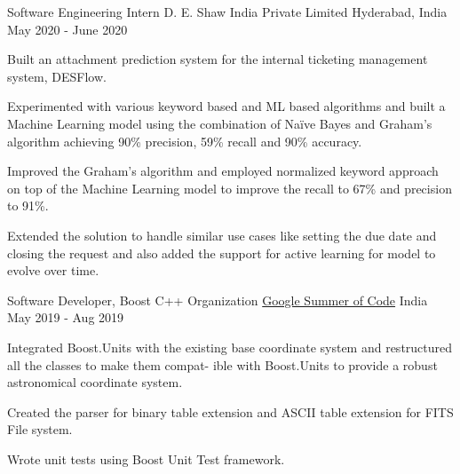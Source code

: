 \begin{cventries}
{\normalsize
  
  \cventry
  {Software Engineering Intern}
  {D. E. Shaw India Private Limited}
  {Hyderabad, India}
  {May 2020 - June 2020}
  {
    \begin{cvitems}
      \item Built an attachment prediction system for the internal ticketing management system, DESFlow.
      \item Experimented with various keyword based and ML based algorithms and built a Machine Learning model using the
      combination of Naïve Bayes and Graham’s algorithm achieving 90\% precision, 59\% recall and 90\% accuracy.
      \item Improved the Graham’s algorithm and employed normalized keyword approach on top of the Machine Learning model
      to improve the recall to 67\% and precision to 91\%.
      \item Extended the solution to handle similar use cases like setting the due date and closing the request and also added the
      support for active learning for model to evolve over time.
      \vspace{2mm}
    \end{cvitems}
  }

  \cventry
  {Software Developer, Boost C++ Organization}
  {\href{https://gist.github.com/sarthak2007/e4cc8b1d5aad194030ba4bfa183a87ef}{Google Summer of Code}}
  {India}
  {May 2019 - Aug 2019}
  {
    \begin{cvitems}
      \item Integrated Boost.Units with the existing base coordinate system and restructured all the classes to make them compat-
      ible with Boost.Units to provide a robust astronomical coordinate system.
      \item Created the parser for binary table extension and ASCII table extension for FITS File system.
      \item Wrote unit tests using Boost Unit Test framework.
      \vspace{2mm}
    \end{cvitems}
  }
  
}
\end{cventries}
